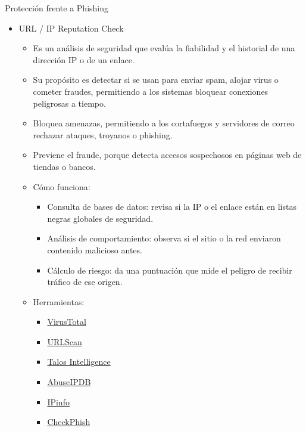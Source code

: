 \documentclass[aspectratio=169,11pt]{beamer}
\begin{document}
\begin{frame}[allowframebreaks]{Protección frente a Phishing}
\begin{itemize}
  \item URL / IP Reputation Check
    \begin{itemize}
    \item Es un análisis de seguridad que evalúa la fiabilidad y el historial de una dirección IP o de un enlace.
    \item Su propósito es detectar si se usan para enviar spam, alojar virus o cometer fraudes, permitiendo a los sistemas bloquear conexiones peligrosas a tiempo.
    \item Bloquea amenazas, permitiendo a los cortafuegos y servidores de correo rechazar ataques, troyanos o phishing.
    \item Previene el fraude, porque detecta accesos sospechosos en páginas web de tiendas o bancos.
    \item Cómo funciona:
      \begin{itemize}
      \item Consulta de bases de datos: revisa si la IP o el enlace están en listas negras globales de seguridad.
      \item Análisis de comportamiento: observa si el sitio o la red enviaron contenido malicioso antes.
      \item Cálculo de riesgo: da una puntuación que mide el peligro de recibir tráfico de ese origen.
      \end{itemize}
    \item Herramientas:
      \begin{itemize}
      \item \href{https://www.virustotal.com/gui/home/search}{VirusTotal}
      \item \href{https://urlscan.io/}{URLScan}
      \item \href{https://www.talosintelligence.com/}{Talos Intelligence}
      \item \href{https://www.abuseipdb.com/}{AbuseIPDB}
      \item \href{https://ipinfo.io/}{IPinfo}
      \item \href{https://checkphish.ai/}{CheckPhish}
      \end{itemize}
    \end{itemize}


\end{itemize}
\end{frame}
\end{document}
